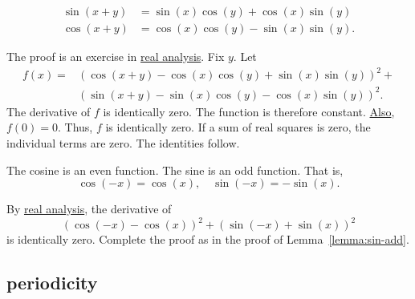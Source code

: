 \begin{lemma}[]\label{lemma:sin-add}
\begin{displaymath}\begin{array}{lll}
\sin(x+y) &= \sin(x)\cos(y) + \cos(x)\sin(y)\\
\cos(x+y)  &= \cos(x)\cos(y) - \sin(x)\sin(y).
\end{array}\end{displaymath}
\end{lemma}
%

\begin{proved}
The proof is an exercise in \hyperref[back:analysis]{real analysis}.
Fix $y$.  Let
\begin{displaymath}\begin{array}{lll}
f(x) = &(\cos(x+y) - \cos(x)\cos(y) +
\sin(x)\sin(y))^2 +\\ & (\sin(x+y) -\sin(x)\cos(y) -
\cos(x)\sin(y))^2.
\end{array}\end{displaymath}
The derivative of $f$ is identically zero.  The function is therefore
constant.  \hyperref[eqn:cos0]{Also}, $f(0)=0$.  Thus, $f$ is
identically zero.  If a sum of real squares is zero, the individual
terms are zero. The identities follow.  \swallowed\end{proved}

\begin{lemma}[]\label{lemma:cos-neg}
  The cosine is an even function.  The sine is an odd function.  That
  is,
\begin{displaymath}
\cos(-x) = \cos(x),\quad\sin(-x) =
    -\sin(x).
\end{displaymath}
\end{lemma}
%
%
%


\begin{proved}
By \hyperref[back:analysis]{real analysis}, the derivative of
\begin{displaymath}
(\cos(-x) - \cos(x))^2 + (\sin(-x)
  +\sin(x))^2
\end{displaymath}
is identically zero.  Complete the proof as in the proof of
Lemma~\ref{lemma:sin-add}.  \swallowed\end{proved}

\subsection{periodicity}
\label{sec:pi}
%


